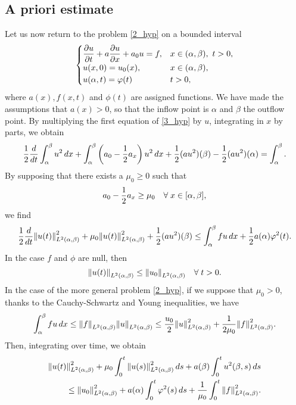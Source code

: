 \subsection{A priori estimate}
Let us now return to the problem \eqref{2_hyp} on a bounded interval
\begin{equation}
    \begin{cases}
        \displaystyle \partialderivative{u}{t} + a \partialderivative{u}{x} + a_0 u =  f, & x \in (\alpha, \beta), \ t > 0, \\
        u(x,0) = u_0(x), & x \in (\alpha,\beta), \\
        u(\alpha, t) = \phi(t) & t > 0,
    \end{cases}
    \label{3_hyp}
\end{equation}
where \(a(x), f(x,t)\) and \(\phi(t)\) are assigned functions. We have made the assumptions that \(a(x) > 0\), so that the inflow point is \(\alpha\) and \(\beta\) the outflow point. By multiplying the first equation of \eqref{3_hyp} by \(u\), integrating in \(x\) by parts, we obtain 
\begin{equation*}
    \frac{1}{2}\frac{d}{dt} \int_\alpha^\beta u^2 \, dx + \int_\alpha^\beta \left( a_0 - \frac{1}{2} a_x \right) u^2 \, dx + \frac{1}{2} (au^2)(\beta) -\frac{1}{2} (au^2)(\alpha) = \int_\alpha^\beta.
\end{equation*}
By supposing that there exists a \(\mu_0 \geq 0\) such that
\[
    a_0 -\frac{1}{2} a_x \geq \mu_0 \quad \forall \; x \in [\alpha, \beta],
\]
we find 
\[
    \frac{1}{2} \frac{d}{dt} \norm{u(t)}^2_{L^2(\alpha,\beta)} + \mu_0 \norm{u(t)}^2_{L^2(\alpha,\beta)} + \frac{1}{2} (au^2)(\beta) \leq \int_\alpha^\beta fu \, dx + \frac{1}{2} a(\alpha)\varphi^2(t).
\]
In the case \(f\) and \(\phi\) are null, then
\[
    \norm{u(t)}_{L^2(\alpha,\beta)} \leq \norm{u_0}_{L^2(\alpha,\beta)} \quad \forall \; t > 0.
\]
In the case of the more general problem \eqref{2_hyp}, if we suppose that \(\mu_0 > 0\), thanks to the Cauchy-Schwartz and Young inequalities, we have
\[
    \int_\alpha^\beta fu \, dx \leq \norm{f}_{L^2(\alpha,\beta)}\norm{u}_{L^2(\alpha,\beta)} \leq \frac{u_0}{2} \norm{u}_{L^2(\alpha,\beta)}^2 + \frac{1}{2\mu_0} \norm{f}_{L^2(\alpha,\beta)}^2.
\]
Then, integrating over time, we obtain 
\begin{equation*}
    \begin{split}
        \norm{u(t)}_{L^2(\alpha,\beta)}^2 + \mu_0 \int_0^t \norm{u(s)}_{L^2(\alpha,\beta)}^2 \, ds + a(\beta)\int_0^t u^2(\beta,s) \, ds \\
        \leq \norm{u_0}^2_{L^2(\alpha,\beta)} + a(\alpha)\int^t_0 \varphi^2(s) \, ds + \frac{1}{\mu_0} \int_0^t \norm{f}^2_{L^2(\alpha,\beta)}.
    \end{split}
\end{equation*}
